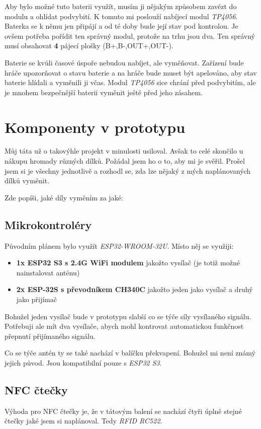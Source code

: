 \documentclass[11pt,a4paper]{article}
\begin{document}
\noindent Aby bylo možné tuto baterii využít, musím ji nějakým způsobem zavézt do modulu a ohlídat podvybití. K tomuto mi poslouží nabíjecí modul \textit{TP4056}. Baterka se k němu jen připájí a od té doby bude její stav pod kontrolou. Je ovšem potřeba pořídit ten správný modul, protože na trhu jsou dva. Ten správný musí obsahovat \textbf{4} pájecí plošky (B+,B-,OUT+,OUT-).

\noindent Baterie se kvůli časové úspoře nebudou nabíjet, ale vyměňovat. Zařízení bude hráče upozorňovat o stavu baterie a na hráče bude muset být apelováno, aby stav baterie hlídali a vyměnili ji včas. Modul \textit{TP4056} sice chrání před podvybitím, ale je mnohem bezpečnější baterii vyměnit ještě před jeho zásahem.

\section{Komponenty v prototypu}
Můj táta už o takovýhle projekt v minulosti usiloval. Avšak to celé skončilo u nákupu hromady různých dílků. Požádal jsem ho o to, aby mi je svěřil. Prošel jsem si je všechny jednotlivě a rozhodl se, zda lze nějaký z mých naplánovaných dílků vyměnit. 

\noindent Zde popíši, jaké díly vyměním za jaké: 

\subsection{Mikrokontroléry}
Původním plánem bylo využít \textit{ESP32-WROOM-32U}. Místo něj se využiji: 
\begin{itemize}
    \item \textbf{1x ESP32 S3 s 2.4G WiFi modulem} jakožto vysílač (je totiž možné nainstalovat anténu)
    \item \textbf{2x ESP-32S s převodníkem CH340C} jakožto jeden jako vysílač a druhý jako přijímač
\end{itemize}
\noindent Bohužel jeden vysílač bude v prototypu slabší co se týče síly vysílaného signálu. Potřebuji ale mít dva vysílače, abych mohl kontrovat automatickou funkčnost přepnutí přijímaného signálu. 

\noindent Co se týče antén ty se také nachází v balíčku překvapení. Bohužel mi není známý jejich původ. Jsou kompatibilní pouze s \textit{ESP32 S3}.

\subsection{NFC čtečky}
Výhoda pro NFC čtečky je, že v tátovým balení se nachází čtyři úplně stejné čtečky jaké jsem si naplánoval. Tedy \textit{RFID RC522}.
\end{document}
